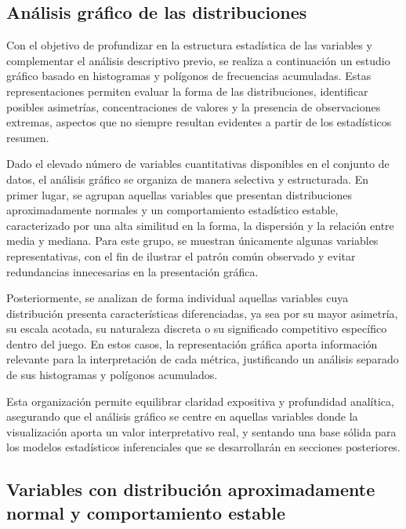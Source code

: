 \documentclass[12pt]{article}
\begin{document}

\subsection{Análisis gráfico de las distribuciones}

Con el objetivo de profundizar en la estructura estadística de las variables y complementar el
análisis descriptivo previo, se realiza a continuación un estudio gráfico basado en histogramas
y polígonos de frecuencias acumuladas. Estas representaciones permiten evaluar la forma de las
distribuciones, identificar posibles asimetrías, concentraciones de valores y la presencia de
observaciones extremas, aspectos que no siempre resultan evidentes a partir de los estadísticos
resumen.

Dado el elevado número de variables cuantitativas disponibles en el conjunto de datos, el
análisis gráfico se organiza de manera selectiva y estructurada. En primer lugar, se agrupan
aquellas variables que presentan distribuciones aproximadamente normales y un comportamiento
estadístico estable, caracterizado por una alta similitud en la forma, la dispersión y la
relación entre media y mediana. Para este grupo, se muestran únicamente algunas variables
representativas, con el fin de ilustrar el patrón común observado y evitar redundancias
innecesarias en la presentación gráfica.

Posteriormente, se analizan de forma individual aquellas variables cuya distribución presenta
características diferenciadas, ya sea por su mayor asimetría, su escala acotada, su naturaleza
discreta o su significado competitivo específico dentro del juego. En estos casos, la
representación gráfica aporta información relevante para la interpretación de cada métrica,
justificando un análisis separado de sus histogramas y polígonos acumulados.

Esta organización permite equilibrar claridad expositiva y profundidad analítica, asegurando
que el análisis gráfico se centre en aquellas variables donde la visualización aporta un valor
interpretativo real, y sentando una base sólida para los modelos estadísticos inferenciales que
se desarrollarán en secciones posteriores.

\subsection*{Variables con distribución aproximadamente normal y comportamiento estable}
\end{document}
